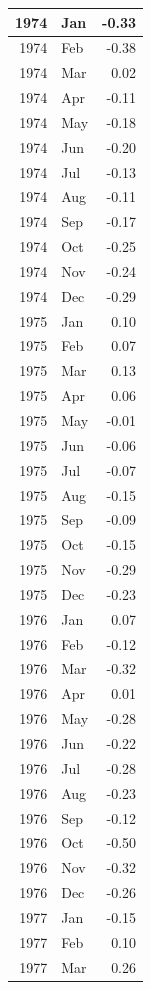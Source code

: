 \documentclass[
]{article}
\begin{document}
\begin{table}[H]
\begin{tabular}[t]{r|l|r}
\hline
1974 & Jan & -0.33\\
\hline
1974 & Feb & -0.38\\
\hline
1974 & Mar & 0.02\\
\hline
1974 & Apr & -0.11\\
\hline
1974 & May & -0.18\\
\hline
1974 & Jun & -0.20\\
\hline
1974 & Jul & -0.13\\
\hline
1974 & Aug & -0.11\\
\hline
1974 & Sep & -0.17\\
\hline
1974 & Oct & -0.25\\
\hline
1974 & Nov & -0.24\\
\hline
1974 & Dec & -0.29\\
\hline
1975 & Jan & 0.10\\
\hline
1975 & Feb & 0.07\\
\hline
1975 & Mar & 0.13\\
\hline
1975 & Apr & 0.06\\
\hline
1975 & May & -0.01\\
\hline
1975 & Jun & -0.06\\
\hline
1975 & Jul & -0.07\\
\hline
1975 & Aug & -0.15\\
\hline
1975 & Sep & -0.09\\
\hline
1975 & Oct & -0.15\\
\hline
1975 & Nov & -0.29\\
\hline
1975 & Dec & -0.23\\
\hline
1976 & Jan & 0.07\\
\hline
1976 & Feb & -0.12\\
\hline
1976 & Mar & -0.32\\
\hline
1976 & Apr & 0.01\\
\hline
1976 & May & -0.28\\
\hline
1976 & Jun & -0.22\\
\hline
1976 & Jul & -0.28\\
\hline
1976 & Aug & -0.23\\
\hline
1976 & Sep & -0.12\\
\hline
1976 & Oct & -0.50\\
\hline
1976 & Nov & -0.32\\
\hline
1976 & Dec & -0.26\\
\hline
1977 & Jan & -0.15\\
\hline
1977 & Feb & 0.10\\
\hline
1977 & Mar & 0.26\\

\end{tabular}
\end{table}
\end{document}
